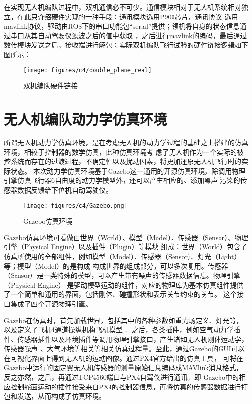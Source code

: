 在实现无人机编队过程中，双机通信必不可少。通信模块相对于无人机系统相对独立，在此只介绍硬件实现的一种手段：通讯模块选用P900芯片，通讯协议
选用mavlink协议，驱动由ROS下的串口功能包“serial”提供；领机将自身的状态信息通过串口从其自动驾驶仪滤波之后的值中获取
，之后进行mavlink的编码，最后通过数传模块发送之后，接收端进行解包；实际双机编队飞行试验的硬件链接逻辑如下图所示：
\begin{figure}[H]
    \centering
    \texttt{[image: figures/c4/double\_plane\_real]}
    \caption{双机编队硬件链接}\label{fig:c4-double_plane_real}
\end{figure}
\section{无人机编队动力学仿真环境}
所谓无人机动力学仿真环境，是在考虑无人机的动力学过程的基础之上搭建的仿真环境，相较于控制器的数学仿真，此种仿真环境考
虑了无人机作为一个实际的被控系统而存在的过渡过程，不确定性以及扰动因素，将更加还原无人机飞行时的实际状态。
本次动力学仿真环境基于Gazebo这一通用的开源仿真环境，除调用物理引擎仿真飞行器6自由度的动力学模型外，还可以产生相应的、添加噪声
污染的传感器数据反馈给下位机自动驾驶仪。
\begin{figure}[H]
    \centering
    \texttt{[image: figures/c4/Gazebo.png]}
    \caption{Gazebo仿真环境}\label{fig:c4-Gazebo}
\end{figure}

Gazebo仿真环境可看做由世界（World）、模型（Model）、传感器（Sensor）、物理引擎（Physical Engine）以及插件（Plugin）等模块
组成：世界（World）包含了仿真所使用的全部组件，例如模型（Model）、传感器（Sensor）、灯光（Light）等；模型（Model）的是构成
构成世界的组成部分，可以多次复用。传感器（Sensor）是一类特殊的模型，可以产生带有噪声的传感器数据信息。物理引擎（Physical Engine）
是驱动模型运动的组件，对应的物理库为基本仿真组件提供了一个简单和通用的界面，包括刚体、碰撞形状和表示关节约束的关节。
这个接口集成了四个开源物理引擎。

Gazebo在仿真时，首先加载世界，包括其中的各种参数如重力场定义、灯光等，以及定义了飞机4通道操纵机构飞机模型；
之后，各类插件，例如空气动力学插件、传感器插件以及环境插件等调用物理引擎接口，产生诸如无人机刚体运动学，传感器噪声
、大气环境等相关等相关仿真过程量。至此，通过Gazebo的GUI可以在可视化界面上得到无人机的运动图像。通过PX4官方给出的仿真工具，
可将在Gazebo中运行的固定翼无人机传感器的测量原始信息编码成MAVlink消息格式，反之亦然，之后，再通过TCP4560端口与PX4自驾仪进行通讯，即
Gazebo中的相应控制舵面运动的插件接受来自PX4的控制器信息，再将仿真的传感器数据进行打包和发送，从而构成了仿真环境。

